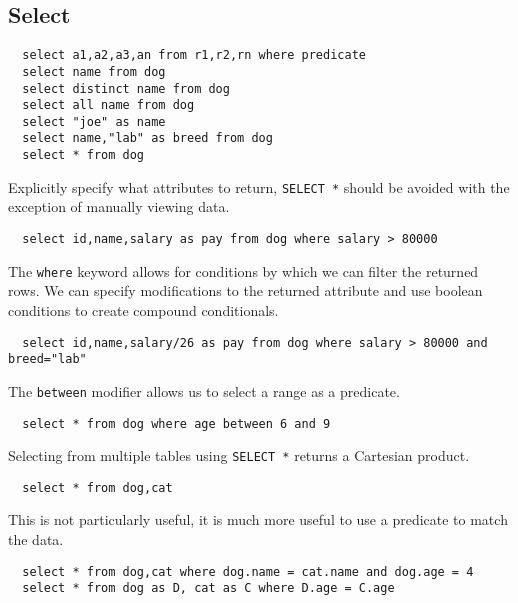 \documentclass{math}
\begin{document}
\subsection*{Select}
\begin{lstlisting}
  select a1,a2,a3,an from r1,r2,rn where predicate
  select name from dog
  select distinct name from dog
  select all name from dog
  select "joe" as name
  select name,"lab" as breed from dog
  select * from dog
\end{lstlisting}
Explicitly specify what attributes to return, \texttt{SELECT *} should be
avoided with the exception of manually viewing data.
\begin{lstlisting}
  select id,name,salary as pay from dog where salary > 80000
\end{lstlisting}
The \texttt{where} keyword allows for conditions by which we can filter the
returned rows. We can specify modifications to the returned attribute and use
boolean conditions to create compound conditionals.
\begin{lstlisting}
  select id,name,salary/26 as pay from dog where salary > 80000 and breed="lab"
\end{lstlisting}
The \texttt{between} modifier allows us to select a range as a predicate.
\begin{lstlisting}
  select * from dog where age between 6 and 9
\end{lstlisting}
Selecting from multiple tables using \texttt{SELECT *} returns a Cartesian
product.
\begin{lstlisting}
  select * from dog,cat
\end{lstlisting}
This is not particularly useful, it is much more useful to use a predicate to
match the data.
\begin{lstlisting}
  select * from dog,cat where dog.name = cat.name and dog.age = 4
  select * from dog as D, cat as C where D.age = C.age
\end{lstlisting}
\end{document}
